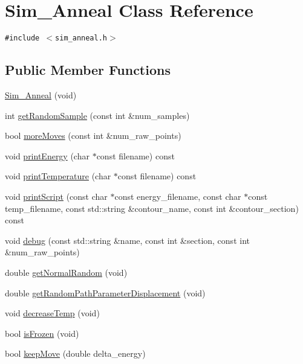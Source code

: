 \hypertarget{classSim__Anneal}{
\section{Sim\_\-Anneal Class Reference}
\label{classSim__Anneal}
}
{\tt \#include $<$sim\_\-anneal.h$>$}

\subsection*{Public Member Functions}
\begin{CompactItemize}
\item 
\hyperlink{classSim__Anneal_603424c51607fd3dc2fe99757106f472}{Sim\_\-Anneal} (void)
\item 
int \hyperlink{classSim__Anneal_7f4531410e05e85db08a3da83d484c49}{getRandomSample} (const int \&num\_\-samples)
\item 
bool \hyperlink{classSim__Anneal_14635d2687f67b208da7664f272c5a78}{moreMoves} (const int \&num\_\-raw\_\-points)
\item 
void \hyperlink{classSim__Anneal_f76b13e223ca4a6b5b544e14a945b805}{printEnergy} (char $\ast$const filename) const 
\item 
void \hyperlink{classSim__Anneal_d89aa35317c42d1e286f735d373329e5}{printTemperature} (char $\ast$const filename) const 
\item 
void \hyperlink{classSim__Anneal_465eb7c7301f09265dafa68d60266bb5}{printScript} (const char $\ast$const energy\_\-filename, const char $\ast$const temp\_\-filename, const std::string \&contour\_\-name, const int \&contour\_\-section) const 
\item 
void \hyperlink{classSim__Anneal_2141dd9baa6a1cba3d5d98f2a1d025b1}{debug} (const std::string \&name, const int \&section, const int \&num\_\-raw\_\-points)
\item 
double \hyperlink{classSim__Anneal_005408a3fedc95d5b8c5ba72d253998a}{getNormalRandom} (void)
\item 
double \hyperlink{classSim__Anneal_515e446dea914e0e8e3651738f88de36}{getRandomPathParameterDisplacement} (void)
\item 
void \hyperlink{classSim__Anneal_6f78eb5ed1ed6e6addf5ffb1b4c7c428}{decreaseTemp} (void)
\item 
bool \hyperlink{classSim__Anneal_75cbcb3507c613bfa0093886b216b7b4}{isFrozen} (void)
\item 
bool \hyperlink{classSim__Anneal_f2bb61f9a80a2e5227eb4002b8ccef09}{keepMove} (double delta\_\-energy)

\end{CompactItemize}
